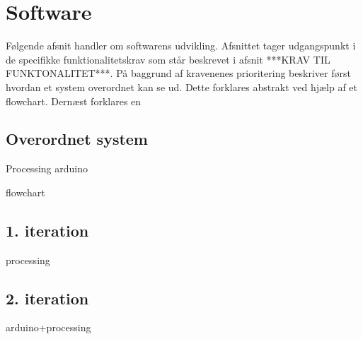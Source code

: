 \chapter{Software}
\label{software}
Følgende afsnit handler om softwarens udvikling. Afsnittet tager udgangspunkt i de specifikke funktionalitetskrav som står beskrevet i afsnit ***KRAV TIL FUNKTONALITET***. På baggrund af kravenenes prioritering beskriver først hvordan et system overordnet kan se ud. Dette forklares abstrakt ved hjælp af et flowchart. Dernæst forklares en

\section{Overordnet system}
Processing arduino 

flowchart

\section{1. iteration}
processing

\section{2. iteration}
arduino+processing 